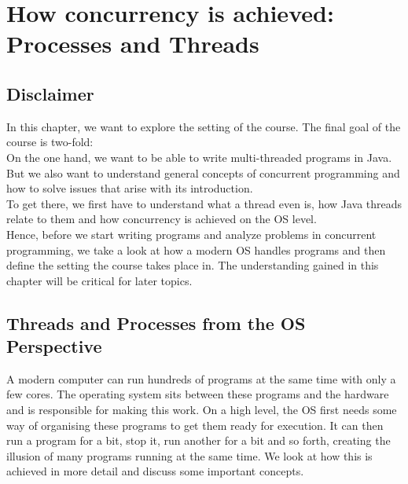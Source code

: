\documentclass[main]{subfiles}
\begin{document}
\section{How concurrency is achieved: Processes and Threads}
\subsection{Disclaimer}
In this chapter, we want to explore the setting of the course. The final goal of the course is two-fold:\\
On the one hand, we want to be able to write multi-threaded programs in Java. But we also want to understand general concepts of concurrent programming and how to solve issues that arise with its introduction.\\
To get there, we first have to understand what a thread even is, how Java threads relate to them and how concurrency is achieved on the OS level.\\
Hence, before we start writing programs and analyze problems in concurrent programming, we take a look at how a modern OS handles programs and then define the setting the course takes place in. The understanding gained in this chapter will be critical for later topics.


\subsection{Threads and Processes from the OS Perspective}
A modern computer can run hundreds of programs at the same time with only a few cores. The operating system sits between these programs and the hardware and is responsible for making this work. On a high level, the OS first needs some way of organising these programs to get them ready for execution. It can then run a program for a bit, stop it, run another for a bit and so forth, creating the illusion of many programs running at the same time. We look at how this is achieved in more detail and discuss some important concepts.
\end{document}
